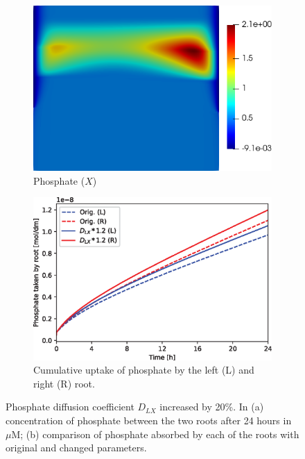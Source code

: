 \documentclass[11pt]{article}
\numberwithin{equation}{section}
\begin{document}
\begin{figure}[!htb]
\centering
\begin{subfigure}[t]{0.35\textwidth}
    \includegraphics[width=\textwidth]{Figures/X_DXup20.png}
    \caption{Phosphate ($X$)}
    \label{fig:numexp_DLXup1}
\end{subfigure}
\qquad
\begin{subfigure}[t]{0.4\textwidth}
    \includegraphics[width=\textwidth]{Figures/DXup20.eps}
    \caption{Cumulative uptake of phosphate by the left (L) and right (R) root.}
    \label{fig:numexp_DLXup2}
\end{subfigure}

\caption{Phosphate diffusion coefficient $D_{LX}$ increased by 20\%. In (a) concentration of phosphate between the two roots after 24 hours in $\mu$M; (b) comparison of phosphate absorbed by each of the roots with original and changed parameters.}
\label{fig:numexp_DLXup}
\end{figure}
\end{document}
